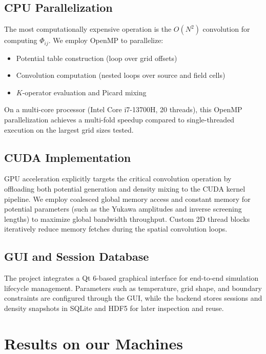\documentclass[conference]{IEEEtran}
\begin{document}
\subsection{CPU Parallelization}

The most computationally expensive operation is the $O(N^2)$ convolution for computing $\Phi_{ij}$. We employ OpenMP to parallelize:
\begin{itemize}
    \item Potential table construction (loop over grid offsets)
    \item Convolution computation (nested loops over source and field cells)
    \item $K$-operator evaluation and Picard mixing
\end{itemize}

On a multi-core processor (Intel Core i7-13700H, 20 threads), this OpenMP parallelization achieves a multi-fold speedup compared to single-threaded execution on the largest grid sizes tested.

\subsection{CUDA Implementation}

GPU acceleration explicitly targets the critical convolution operation by offloading both potential generation and density mixing to the CUDA kernel pipeline. We employ coalesced global memory access and constant memory for potential parameters (such as the Yukawa amplitudes and inverse screening lengths) to maximize global bandwidth throughput. Custom 2D thread blocks iteratively reduce memory fetches during the spatial convolution loops.

\subsection{GUI and Session Database}

The project integrates a Qt 6-based graphical interface for end-to-end simulation lifecycle management. Parameters such as temperature, grid shape, and boundary constraints are configured through the GUI, while the backend stores sessions and density snapshots in SQLite and HDF5 for later inspection and reuse.

\section{Results on our Machines}
\end{document}
